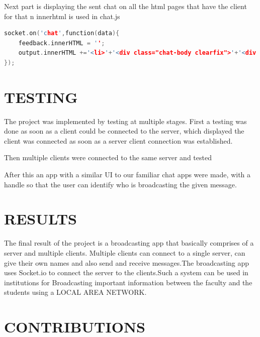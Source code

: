 \documentclass{fisatproject}
\begin{document}
    \vspace{1cm}
    Next part is displaying the sent chat on all the html pages that have the client for that n innerhtml is used in chat.js 
    \begin{lstlisting}[language=c++]
	socket.on('chat',function(data){
    feedback.innerHTML = '';
    output.innerHTML +='<li>'+'<div class="chat-body clearfix">'+'<div class="header">'+'<small class=" text-muted">'+'<span class="glyphicon glyphicon-time">'+'</span>'+ date +'</small>'+' <strong class="pull-right primary-font">'+data.handle+'</strong>' +'</div>'+'<p>'+ data.message + '</p>'+'</div>'+'</li>';
});

   \end{lstlisting}


\chapter{TESTING}
The project was implemented by testing at multiple stages.
First a testing was done as soon as a client could be connected to the server, which displayed the client was connected as soon as a server client connection was established.


Then multiple clients were connected to the same server and tested



After this an app with a similar UI to our familiar chat apps were made, with a handle so that the user can identify who is broadcasting the given message.
\chapter{RESULTS}


The final result of the project is a broadcasting app that basically comprises of a server and multiple clients. Multiple clients can connect to a single server, can give their own names and also send and receive messages.The broadcasting app uses Socket.io to connect the server to the clients.Such a system can be used in institutions for Broadcasting important information between the faculty and the students using a LOCAL AREA NETWORK.












\chapter{CONTRIBUTIONS}
\end{document}
